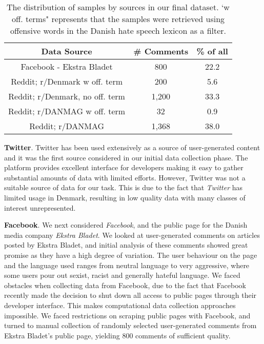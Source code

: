 \documentclass{article}
\begin{document}
\begin{table}
\centering
\small
\caption{The distribution of samples by sources in our final dataset. `w off. terms" represents that the samples were retrieved using offensive words in the Danish hate speech lexicon as a filter.}
\begin{tabular}{c|c|c}
\textbf{Data Source}                       & \textbf{\# Comments} & \textbf{\% of all}\\\hline
Facebook - Ekstra Bladet               & 800                         & 22.2\\
Reddit; r/Denmark w off. term   & 200                         & 5.6\\
Reddit; r/Denmark, no off. term & 1,200                        & 33.3\\
Reddit; r/DANMAG w off. term    & 32                          & 0.9\\
Reddit; r/DANMAG                     & 1,368                       & 38.0\\
\end{tabular}
\label{table:daDatasetSources}
\end{table}

\textbf{Twitter}. Twitter has been used extensively as a source of user-generated content and it was the first source considered in our initial data collection phase. The platform provides excellent interface for developers making it easy to gather substantial amounts of data with limited efforts. However, Twitter was not a suitable source of data for our task. This is due to the fact that \textit{Twitter} has limited usage in Denmark, resulting in low quality data with many classes of interest unrepresented.

\textbf{Facebook}. We next considered \textit{Facebook}, and the public page for the Danish media company \textit{Ekstra Bladet}. 
We looked at user-generated comments on articles posted by Ekstra Bladet, and initial analysis of these comments showed great promise as they have a high degree of variation.
The user behaviour on the page and the language used ranges from neutral language to very aggressive, where some users pour out sexist, racist and generally hateful language. 
We  faced obstacles when collecting data from Facebook, due to the fact that Facebook recently made the decision to shut down all access to public pages through their developer interface. This makes computational data collection approaches impossible. We faced restrictions on scraping public pages with Facebook, and turned to manual collection of randomly selected user-generated comments from Ekstra Bladet's public page, yielding 800 comments of sufficient quality.
\end{document}
